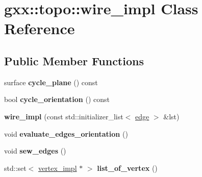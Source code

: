 \hypertarget{classgxx_1_1topo_1_1wire__impl}{}\section{gxx\+:\+:topo\+:\+:wire\+\_\+impl Class Reference}
\label{classgxx_1_1topo_1_1wire__impl}
\subsection*{Public Member Functions}
\begin{DoxyCompactItemize}
\item 
surface {\bfseries cycle\+\_\+plane} () const \hypertarget{classgxx_1_1topo_1_1wire__impl_aa9ca410f6a3e51e20481152da2efea20}{}\label{classgxx_1_1topo_1_1wire__impl_aa9ca410f6a3e51e20481152da2efea20}

\item 
bool {\bfseries cycle\+\_\+orientation} () const \hypertarget{classgxx_1_1topo_1_1wire__impl_ae314537bbd7e623769f7642e458d752a}{}\label{classgxx_1_1topo_1_1wire__impl_ae314537bbd7e623769f7642e458d752a}

\item 
{\bfseries wire\+\_\+impl} (const std\+::initializer\+\_\+list$<$ \hyperlink{classgxx_1_1topo_1_1edge}{edge} $>$ \&lst)\hypertarget{classgxx_1_1topo_1_1wire__impl_af3318cf0105bc76c59e4317d3cf62cfd}{}\label{classgxx_1_1topo_1_1wire__impl_af3318cf0105bc76c59e4317d3cf62cfd}

\item 
void {\bfseries evaluate\+\_\+edges\+\_\+orientation} ()\hypertarget{classgxx_1_1topo_1_1wire__impl_a12dfc382cfd63de94ea6cff41113eae2}{}\label{classgxx_1_1topo_1_1wire__impl_a12dfc382cfd63de94ea6cff41113eae2}

\item 
void {\bfseries sew\+\_\+edges} ()\hypertarget{classgxx_1_1topo_1_1wire__impl_abff09df79f043477d25af033cb5fe3f5}{}\label{classgxx_1_1topo_1_1wire__impl_abff09df79f043477d25af033cb5fe3f5}

\item 
std\+::set$<$ \hyperlink{classgxx_1_1topo_1_1vertex__impl}{vertex\+\_\+impl} $\ast$ $>$ {\bfseries list\+\_\+of\+\_\+vertex} ()\hypertarget{classgxx_1_1topo_1_1wire__impl_a5bda324d5b3db6e1bba25f00619c7ba2}{}\label{classgxx_1_1topo_1_1wire__impl_a5bda324d5b3db6e1bba25f00619c7ba2}

\end{DoxyCompactItemize}

